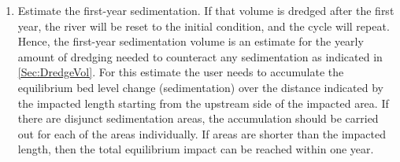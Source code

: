\begin{enumerate}
\item Estimate the first-year sedimentation.
If that volume is dredged after the first year, the river will be reset to the initial condition, and the cycle will repeat.
Hence, the first-year sedimentation volume is an estimate for the yearly amount of dredging needed to counteract any sedimentation as indicated in \autoref{Sec:DredgeVol}.
For this estimate the user needs to accumulate the equilibrium bed level change (sedimentation) over the distance indicated by the impacted length starting from the upstream side of the impacted area.
If there are disjunct sedimentation areas, the accumulation should be carried out for each of the areas individually.
If areas are shorter than the impacted length, then the total equilibrium impact can be reached within one year.
\end{enumerate}
